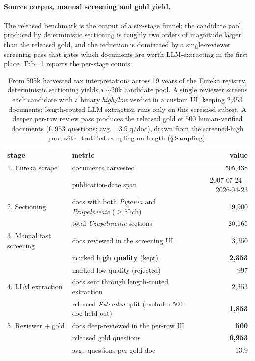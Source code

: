 \paragraph{Source corpus, manual screening and gold yield.}

The released benchmark is the output of a six-stage funnel; the
candidate pool produced by deterministic sectioning is roughly two
orders of magnitude larger than the released gold, and the reduction
is dominated by a single-reviewer screening pass that gates which
documents are worth LLM-extracting in the first place.
Tab.~\ref{tab:funnel} reports the per-stage counts.

\begin{table}[!htb]
\centering
\footnotesize
\begin{tabular}{@{}llr@{}}
\toprule
\textbf{stage} & \textbf{metric} & \textbf{value} \\
\midrule
1. Eureka scrape    & documents harvested            & 505{,}438 \\
                    & publication-date span          & 2007-07-24 -- 2026-04-23 \\
\midrule
2. Sectioning       & docs with both \textit{Pytania} and \textit{Uzupe\l{}nienie} ($\geq 50$\,ch) & 19{,}900 \\
                    & total \textit{Uzupe\l{}nienie} sections                      & 20{,}165 \\
\midrule
3. Manual fast screening & docs reviewed in the screening UI                      & 3{,}350 \\
                    & \quad marked \textbf{high quality} (kept)                    & \textbf{2{,}353} \\
                    & \quad marked low quality (rejected)                          & 997 \\
\midrule
4. LLM extraction   & docs sent through length-routed extraction                   & 2{,}353 \\
                    & \quad released \emph{Extended} split (excludes 500-doc held-out)              & \textbf{1{,}853} \\
\midrule
5. Reviewer + gold  & docs deep-reviewed in the per-row UI                         & \textbf{500} \\
                    & released gold questions                                       & \textbf{6{,}953} \\
                    & avg.\ questions per gold doc                                  & 13.9 \\
\bottomrule
\end{tabular}
\caption{From 505k harvested tax interpretations across 19 years of the
Eureka registry, deterministic sectioning yields a $\sim$20k candidate
pool. A single reviewer screens each candidate with a binary
\textit{high/low} verdict in a custom UI, keeping 2{,}353 documents;
length-routed LLM extraction runs only on this screened subset. A
deeper per-row review pass produces the released gold of $500$
human-verified documents ($6{,}953$ questions; avg.\ $13.9$ q/doc),
drawn from the screened-high pool with stratified sampling on length
(\S\,Sampling).}
\label{tab:funnel}
\end{table}

